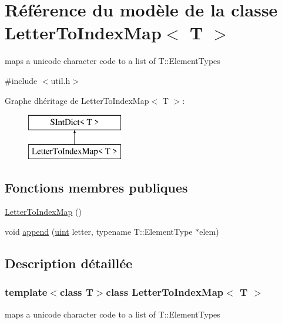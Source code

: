 \hypertarget{class_letter_to_index_map}{}\section{Référence du modèle de la classe Letter\+To\+Index\+Map$<$ T $>$}
\label{class_letter_to_index_map}


maps a unicode character code to a list of T\+::\+Element\+Type\textquotesingle{}s  




{\ttfamily \#include $<$util.\+h$>$}

Graphe d\textquotesingle{}héritage de Letter\+To\+Index\+Map$<$ T $>$\+:\begin{figure}[H]
\begin{center}
\leavevmode
\includegraphics[height=2.000000cm]{class_letter_to_index_map}
\end{center}
\end{figure}
\subsection*{Fonctions membres publiques}
\begin{DoxyCompactItemize}
\item 
\hyperlink{class_letter_to_index_map_a6d19cdb2a634bda4c58a346ce4359d16}{Letter\+To\+Index\+Map} ()
\item 
void \hyperlink{class_letter_to_index_map_a4829c6e2d03220a17da913790b6a597a}{append} (\hyperlink{qglobal_8h_a4d3943ddea65db7163a58e6c7e8df95a}{uint} letter, typename T\+::\+Element\+Type $\ast$elem)
\end{DoxyCompactItemize}


\subsection{Description détaillée}
\subsubsection*{template$<$class T$>$class Letter\+To\+Index\+Map$<$ T $>$}

maps a unicode character code to a list of T\+::\+Element\+Type\textquotesingle{}s 

